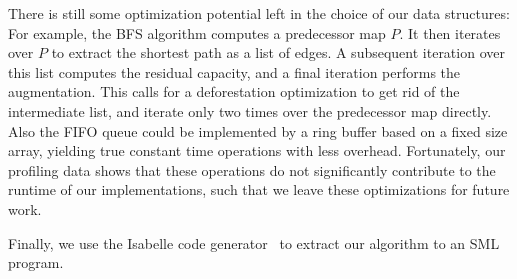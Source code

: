 \documentclass[smallcondensed]{svjour3}     %
\begin{document}
  There is still some optimization potential left in the choice of our data structures: 
  For example, the BFS algorithm computes a predecessor map $P$. It then iterates over $P$ to extract the shortest path as a list of edges.
  A subsequent iteration over this list computes the residual capacity, and a final iteration performs the augmentation. 
  This calls for a deforestation optimization to get rid of the intermediate list, and iterate only two times over the predecessor map directly.
  Also the FIFO queue could be implemented by a ring buffer based on a fixed size array, yielding true constant time operations with less overhead.
  Fortunately, our profiling data shows that these operations do not significantly contribute to the runtime of our implementations, such that 
  we leave these optimizations for future work.
  
  
  Finally, we use the Isabelle code generator~\cite{Haft09,HaNi10} to extract our algorithm to an SML program.
  
\end{document}
